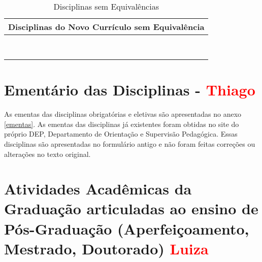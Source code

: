 \begin{table}
	\centering
	\renewcommand{\arraystretch}{1.5}
	\caption{Disciplinas sem Equivalências}
	\label{DiscSemEqui}
	\begin{tabularx}{\textwidth}{|X|}
		\hline
		{\textbf{Disciplinas do Novo Currículo sem Equivalência}} \\
		\hline
		\LogProg                                                  \\
		\IC                                                       \\
		\EngCompSoc                                               \\
		\MineraDados                                              \\
		\SistEmb                                                  \\
		\ProcImag                                                 \\
		\CompParal                                                \\
		\EstSup                                                   \\
		\hline
	\end{tabularx}
\end{table}

\section{Ementário das Disciplinas - \textcolor{red}{Thiago}}

As ementas das disciplinas obrigatórias e eletivas são apresentadas no anexo \ref{ementas}. As ementas das disciplinas já existentes foram obtidas no site do próprio DEP, Departamento de Orientação e Supervisão Pedagógica. Essas disciplinas são apresentadas no formulário antigo e não foram feitas correções ou alterações no texto original.

\section{Atividades Acadêmicas da Graduação articuladas ao ensino de Pós-Graduação (Aperfeiçoamento, Mestrado, Doutorado) \textcolor{red}{Luiza} }

